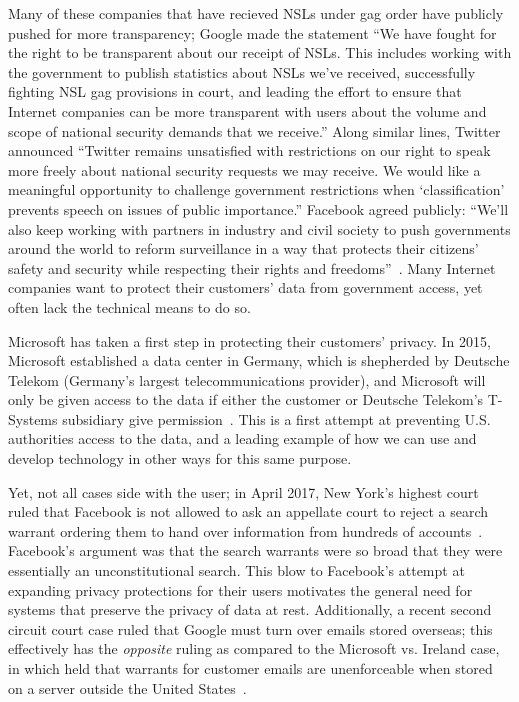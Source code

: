 Many of these companies that have recieved NSLs under gag order have publicly
pushed for more transparency; Google made the statement ``We have fought for
the right to be transparent about our receipt of NSLs. This includes working
with the government to publish statistics about NSLs we’ve received,
successfully fighting NSL gag provisions in court, and leading the effort to
ensure that Internet companies can be more transparent with users about the
volume and scope of national security demands that we receive.'' Along similar
lines, Twitter announced ``Twitter remains unsatisfied with restrictions on
our right to speak more freely about national security requests we may
receive. We would like a meaningful opportunity to challenge government
restrictions when ‘classification’ prevents speech on issues of public
importance.''  Facebook agreed publicly: ``We'll also keep working with
partners in industry and civil society to push governments around the world to
reform surveillance in a way that protects their citizens’ safety and security
while respecting their rights and freedoms''~\cite{cloudflare_gag}.  
Many Internet companies want to protect their customers' data from
government access, yet often lack the technical means to do so.

Microsoft has taken a first step in protecting their customers' privacy.  In
2015, Microsoft established a data center in Germany, which is shepherded by
Deutsche Telekom (Germany's largest telecommunications provider), and
Microsoft will only be given access to the data if either the customer or
Deutsche Telekom's T-Systems subsidiary give
permission~\cite{microsoft_germany}.  This is a first attempt at preventing
U.S. authorities access to the data, and a leading example of how we can use
and develop technology in other ways for this same purpose.

Yet, not all cases side with the user; in April 2017, New
York's highest court ruled that Facebook is not allowed to ask an appellate
court to reject a search warrant ordering them to hand over information from
hundreds of accounts~\cite{facebook_ny}.  Facebook's argument was that the
search warrants were so broad that they were essentially an unconstitutional
search.  This blow to Facebook's attempt at expanding privacy protections for
their users motivates the general need for systems that preserve the privacy
of data at rest.  Additionally, a recent second circuit court case ruled that
Google must turn over emails stored overseas; this effectively has the {\it
opposite} ruling as compared to the Microsoft vs. Ireland case, in which held
that warrants for customer emails are unenforceable when stored on a server
outside the United States~\cite{google_overseas,microsoft_ireland}.

